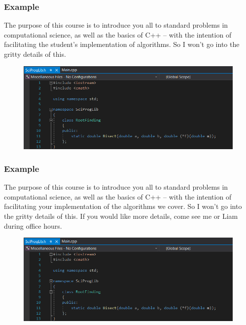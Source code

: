 \documentclass{if-beamer}
\begin{document}
\begin{frame}
    \frametitle{Example}
	The purpose of this course is to introduce you all to standard problems in computational science, as well as the basics of C++ -- with the intention of facilitating the student’s implementation of algorithms. So I won't go into the gritty details of this.
	\begin{figure}
		\centering
		\includegraphics[width = \textwidth]{figures/headerfile}
	\end{figure}
\end{frame}

\begin{frame}
	\frametitle{Example}
	The purpose of this course is to introduce you all to standard problems in computational science, as well as the basics of C++ -- with the intention of facilitating your implementation of the algorithms we cover. So I won't go into the gritty details of this. If you would like more details, come see me or Liam during office hours.
	\begin{figure}
		\centering
		\includegraphics[width = \textwidth]{figures/headerfile}
	\end{figure}
\end{frame}
\end{document}
